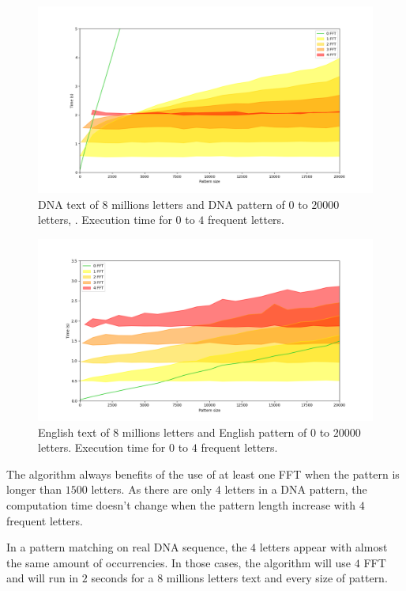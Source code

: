 \documentclass[preprint,12pt]{elsarticle}
\begin{document}
\begin{figure}[h]
\includegraphics[scale=0.45]{./figures/ExHDADN.png}
\caption{DNA text of $8$ millions letters and DNA pattern of $0$ to $20 000$ letters, .
Execution time for $0$ to $4$ frequent letters.}
\label{ExHDADN}
\end{figure}

\begin{figure}[h]
\includegraphics[scale=0.45]{./figures/ExHDEnglish.png}
\caption{English text of $8$ millions letters and English pattern of $0$ to $20 000$ letters.
Execution time for $0$ to $4$ frequent letters.}
\label{ExHDEnglish}
\end{figure}


The algorithm always benefits of the use of at least one FFT when the pattern is longer than $1500$ letters.
As there are only $4$ letters in a DNA pattern,
the computation time doesn't change when the pattern length increase with $4$ frequent letters.

In a pattern matching on real DNA sequence, the $4$ letters appear with almost the same amount of occurrencies.
In those cases,
the algorithm will use $4$ FFT and will run in $2$ seconds
for a $8$ millions letters text and every size of pattern.
\end{document}
